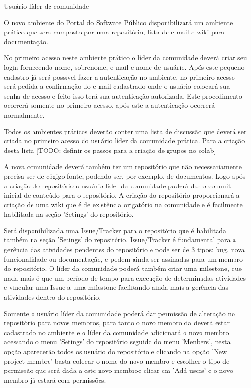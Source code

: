 Usuário líder de comunidade

O novo ambiente do Portal do Software Público disponibilizará um ambiente prático
que será composto por uma repositório, lista de e-mail e wiki para documentação.

No primeiro acesso neste ambiente prático o líder da comunidade deverá criar seu
login fornecendo nome, sobrenome, e-mail e nome de usuário. Após este pequeno 
cadastro já será possível fazer a autenticação no ambiente, no primeiro acesso
será pedida a confirmação do e-mail cadastrado onde o usuário colocará sua senha 
de acesso e feito isso terá sua autenticação autorizada. Este procedimento ocorrerá 
somente no primeiro acesso, após este a autenticação ocorrerá normalmente.

Todos os ambientes práticos deverão conter uma lista de discussão que deverá ser criada
no primeiro acesso do usuário líder da comunidade prática. Para a criação desta lista
[TODO: definir os passos para a criação de grupos no  colab]

A nova comunidade deverá também ter um repositório que não necessariamente precisa
ser de cógigo-fonte, podendo ser, por exemplo, de documentos. Logo após a criação
do repositório o usuário lider da comunidade poderá dar o commit inicial de conteúdo 
para o repositório. A criação do repositório proporcionará a criação de uma wiki que é
de existência origatório na comunidade e é facilmente habilitada na seção 'Setings' 
do repositório.

Será disponibilizada uma Issue/Tracker para o repositório que é habilitada também 
na seção 'Setings' do repositório. Issue/Tracker é fundamental para a gerência das 
atividades pendentes do repositório e pode ser de 3 tipos: bug, nova funcionalidade 
ou documentação,  e podem ainda ser assinadas para um membro do repositório. O líder 
da comunidade poderá também criar uma milestone, que nada mais é que um período de 
tempo para execução de determinadas atividades e vincular uma Issue a uma milestone 
facilitando ainda mais a gerência das atividades dentro do repositório.

Somente o usuário líder da comunidade poderá dar permissão de alteração no repositório
para novos membros, para tanto o novo membro da deverá estar cadastrado no ambiente
e o líder da comunidade adicionará o novo membro acessando o menu 'Setings' do
repositório seguido do menu 'Menbers', nesta opção aparecerão todos os usuário do
repositório e clicando na opção 'New project membre' basta colocar o nome do novo
membro e escolher o tipo de permissão que será dada a este novo membroe clicar em 
'Add users' e o novo membro já estará com permissões.

